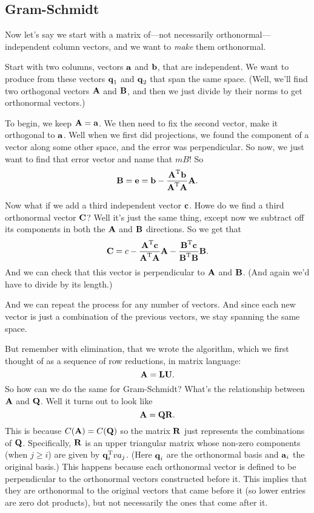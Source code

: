 \subsection{Gram-Schmidt}

Now let's say we start with a matrix of---not necessarily orthonormal---independent column vectors, and we want to \textit{make} them orthonormal.

Start with two columns, vectors $\boldsymbol{\mathbf{a}}$ and $\boldsymbol{\mathbf{b}}$, that are independent. We want to produce from these vectors $\boldsymbol{\mathbf{q}}_1$ and $\boldsymbol{\mathbf{q}}_2$ that span the same space. (Well, we'll find two orthogonal vectors $\boldsymbol{\mathbf{A}}$ and $\boldsymbol{\mathbf{B}}$, and then we just divide by their norms to get orthonormal vectors.)

To begin, we keep $\boldsymbol{\mathbf{A}}=\boldsymbol{\mathbf{a}}$. We then need to fix the second vector, make it orthogonal to $\boldsymbol{\mathbf{a}}$. Well when we first did projections, we found the component of a vector along some other space, and the error was perpendicular. So now, we just want to find that error vector and name that $mB$! So
\[ \boldsymbol{\mathbf{B}} = \boldsymbol{\mathbf{e}} = \boldsymbol{\mathbf{b}} - \frac{\boldsymbol{\mathbf{A}}^\mathrm{T}\boldsymbol{\mathbf{b}}}{\boldsymbol{\mathbf{A}}^\mathrm{T}\boldsymbol{\mathbf{A}}}\boldsymbol{\mathbf{A}}. \]

Now what if we add a third independent vector $\boldsymbol{\mathbf{c}}$. Howe do we find a third orthonormal vector $\boldsymbol{\mathbf{C}}$? Well it's just the same thing, except now we subtract off its components in both the $\boldsymbol{\mathbf{A}}$ and $\boldsymbol{\mathbf{B}}$ directions. So we get that
\[ \boldsymbol{\mathbf{C}} = c - \frac{\boldsymbol{\mathbf{A}}^\mathrm{T}\boldsymbol{\mathbf{c}}}{\boldsymbol{\mathbf{A}}^\mathrm{T}\boldsymbol{\mathbf{A}}}\boldsymbol{\mathbf{A}} - \frac{\boldsymbol{\mathbf{B}}^\mathrm{T}\boldsymbol{\mathbf{c}}}{\boldsymbol{\mathbf{B}}^\mathrm{T}\boldsymbol{\mathbf{B}}}\boldsymbol{\mathbf{B}}. \]
And we can check that this vector is perpendicular to $\boldsymbol{\mathbf{A}}$ and $\boldsymbol{\mathbf{B}}$. (And again we'd have to divide by its length.)

And we can repeat the process for any number of vectors. And since each new vector is just a combination of the previous vectors, we stay spanning the same space.

But remember with elimination, that we wrote the algorithm, which we first thought of as a sequence of row reductions, in matrix language:
\[ \boldsymbol{\mathbf{A}} = \boldsymbol{\mathbf{L}}\boldsymbol{\mathbf{U}}. \]
So how can we do the same for Gram-Schmidt? What's the relationship between $\boldsymbol{\mathbf{A}}$ and $\boldsymbol{\mathbf{Q}}$. Well it turns out to look like
\[ \boldsymbol{\mathbf{A}} = \boldsymbol{\mathbf{Q}}\boldsymbol{\mathbf{R}}. \]
This is because $C(\boldsymbol{\mathbf{A}}) = C(\boldsymbol{\mathbf{Q}})$ so the matrix $\boldsymbol{\mathbf{R}}$ just represents the combinations of $\boldsymbol{\mathbf{Q}}$. Specifically, $\boldsymbol{\mathbf{R}}$ is an upper triangular matrix whose non-zero components (when $j \ge i$) are given by $\boldsymbol{\mathbf{q}}^\mathrm{T}_i
va_j$. (Here $\boldsymbol{\mathbf{q}}_i$ are the orthonormal basis and $\boldsymbol{\mathbf{a}}_i$ the original basis.) This happens because each orthonormal vector is defined to be perpendicular to the orthonormal vectors constructed before it. This implies that they are orthonormal to the original vectors that came before it (so lower entries are zero dot products), but not necessarily the ones that come after it.